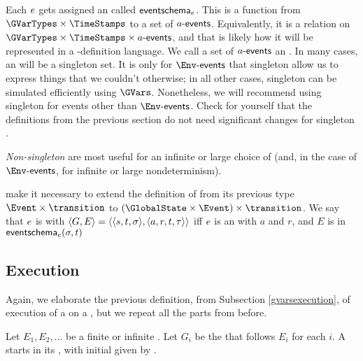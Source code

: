 \documentclass[12pt]{article}
\begin{document}
Each  $e$ gets assigned an  called $\textsf{eventschema}_{e}$. This is a function from $\GVarTypes \times \TimeStamps$ to a set of $a\textsf{-events}$. Equivalently, it is a relation on $\GVarTypes \times \TimeStamps \times \depEvents{a}$, and that is likely how it will be represented in a \Contract-definition language. We call a set of $a\textsf{-events}$ an \EventSchema. In many cases, an \EventSchema will be a singleton set. It is only for $\depEvents{\Env}$ that singleton \EventSchema allow us to express things that we couldn't otherwise; in all other cases, singleton \EventSchema can be simulated efficiently using $\GVars$. Nonetheless, we will recommend using singleton \EventSchema for events other than $\depEvents{\Env}$. Check for yourself that the definitions from the previous section do not need significant changes for singleton \EventSchema.

{\it Non-singleton} \EventSchema are most useful for an infinite or large choice of \Actions (and, in the case of $\depEvents{\Env}$, for infinite or large nondeterminism).

\EventSchema make it necessary to extend the definition of \compatible from its previous type $\Event \times \transition$ to $(\GlobalState \times \Event) \times \transition$. We say that \atransition $e$ is  with  $\langle G,E\rangle = \langle\langle s,t,\sigma\rangle,\langle a,r,t,\tau\rangle\rangle$ iff
$e$ is an  with \Action $a$  and \Role $r$, and  $E$ is in $\textsf{eventschema}_{e}(\sigma, t)$









\subsection{Execution} \label{schemasexecution}

Again, we elaborate the previous definition, from Subsection \ref{gvarsexecution}, of execution of a \Contract on a \trace, but we repeat all the parts from before.

\medskip

Let $E_1, E_2, \dots$ be a finite or infinite \trace. Let $G_i$ be the \GlobalState that follows $E_i$ for each $i$. A \Contract starts in its \startstate, with initial \gvarsassign given by \initvals.
\end{document}
